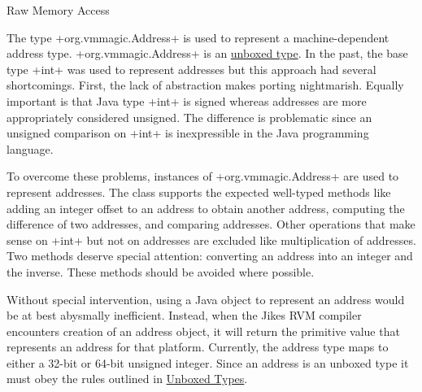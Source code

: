 \begin{section}{Raw Memory Access}
\label{sec:rawmemoryaccess}

The type \spverb+org.vmmagic.Address+ is used to represent a machine-dependent address type. \spverb+org.vmmagic.Address+ is an \hyperref[sec:unboxedtypes]{unboxed type}. In the past, the base type \spverb+int+ was used to represent addresses but this approach had several shortcomings. First, the lack of abstraction makes porting nightmarish. Equally important is that Java type \spverb+int+ is signed whereas addresses are more appropriately considered unsigned. The difference is problematic since an unsigned comparison on \spverb+int+ is inexpressible in the Java programming language.

To overcome these problems, instances of \spverb+org.vmmagic.Address+ are used to represent addresses. The class supports the expected well-typed methods like adding an integer offset to an address to obtain another address, computing the difference of two addresses, and comparing addresses. Other operations that make sense on \spverb+int+ but not on addresses are excluded like multiplication of addresses. Two methods deserve special attention: converting an address into an integer and the inverse. These methods should be avoided where possible.

Without special intervention, using a Java object to represent an address would be at best abysmally inefficient. Instead, when the Jikes RVM compiler encounters creation of an address object, it will return the primitive value that represents an address for that platform. Currently, the address type maps to either a 32-bit or 64-bit unsigned integer. Since an address is an unboxed type it must obey the rules outlined in \hyperref[sec:unboxedtypes]{Unboxed Types}.

\end{section}
